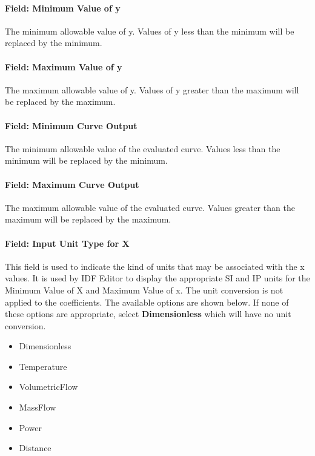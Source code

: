 \paragraph{Field: Minimum Value of y}\label{field-minimum-value-of-y-2}

The minimum allowable value of y. Values of y less than the minimum will be replaced by the minimum.

\paragraph{Field: Maximum Value of y}\label{field-maximum-value-of-y-2}

The maximum allowable value of y. Values of y greater than the maximum will be replaced by the maximum.

\paragraph{Field: Minimum Curve Output}\label{field-minimum-curve-output-6}

The minimum allowable value of the evaluated curve. Values less than the minimum will be replaced by the minimum.

\paragraph{Field: Maximum Curve Output}\label{field-maximum-curve-output-5}

The maximum allowable value of the evaluated curve. Values greater than the maximum will be replaced by the maximum.

\paragraph{Field: Input Unit Type for X}\label{field-input-unit-type-for-x-7}

This field is used to indicate the kind of units that may be associated with the x values. It is used by IDF Editor to display the appropriate SI and IP units for the Minimum Value of X and Maximum Value of x. The unit conversion is not applied to the coefficients. The available options are shown below. If none of these options are appropriate, select \textbf{Dimensionless} which will have no unit conversion.

\begin{itemize}
\item
  Dimensionless
\item
  Temperature
\item
  VolumetricFlow
\item
  MassFlow
\item
  Power
\item
  Distance
\end{itemize}

